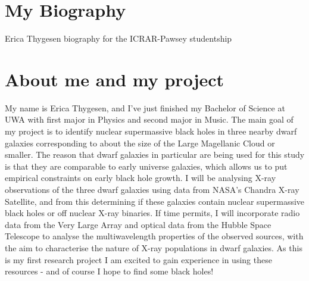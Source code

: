 \section{My Biography}
Erica Thygesen biography for the ICRAR-Pawsey studentship


\section{About me and my project}
My name is Erica Thygesen, and I’ve just finished my Bachelor of Science at UWA with first 
major in Physics and second major in Music. The main goal of my project is to identify 
nuclear supermassive black holes in three nearby dwarf galaxies corresponding to about the 
size of the Large Magellanic Cloud or smaller. The reason that dwarf galaxies in particular 
are being used for this study is that they are comparable to early universe galaxies, which 
allows us to put empirical constraints on early black hole growth. I will be analysing X-ray 
observations of the three dwarf galaxies using data from NASA’s Chandra X-ray Satellite, and 
from this determining if these galaxies contain nuclear supermassive black holes or off 
nuclear X-ray binaries. If time permits, I will incorporate radio data from the Very Large 
Array and optical data from the Hubble Space Telescope to analyse the multiwavelength 
properties of the observed sources, with the aim to characterise the nature of X-ray 
populations in dwarf galaxies. As this is my first research project I am excited to gain 
experience in using these resources - and of course I hope to find some black holes!
